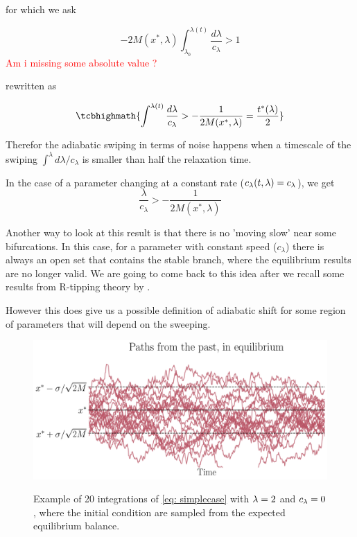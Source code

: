 for which we ask 

\begin{equation}
 -2M(x^*,\lambda)	\int_{\lambda_0}^{\lambda(t)} \frac{d\lambda}{c_\lambda} >1
\end{equation}
\textcolor{red}{Am i missing some absolute value ?}


rewritten as  

\begin{equation}
	\tcbhighmath{
	\int^{\lambda(t)} \frac{d\lambda}{c_\lambda} >-\frac{1}{2M(x^*,\lambda)}=\frac{t^*(\lambda)}{2}
}
	\label{eq:noiseadiab}
\end{equation}

Therefor the adiabatic swiping in terms of noise happens when a timescale of the swiping  $\int^{\lambda} d\lambda / c_\lambda$ is smaller than half the relaxation time. 

In the case of a parameter changing at a constant rate ($c_\lambda(t,\lambda)=c_\lambda$), we get 
\begin{equation}
	\frac{\lambda}{c_\lambda} >-\frac{1}{2M(x^*,\lambda)}
	\label{eq:noiseadiab_cte}
\end{equation}

Another way to look at this result is that there is no 'moving slow' near some bifurcations. In this case, for a parameter with constant speed ($c_\lambda$) there is always an open set that contains the stable branch, where the equilibrium results are no longer valid. We are going to come back to this idea after we recall some results from R-tipping theory by \cite{Ashwin, the other one}.

However this does give us a possible definition of adiabatic shift for some region of parameters that will depend on the sweeping.  



\begin{figure}[htb]
	\centering
	\includegraphics[width=0.9\linewidth]{Images/Metrics/diff_init2}\\
	\caption{ Example of 20 integrations of \cref{eq: simplecase} with $\lambda=2$ and $c_\lambda=0$, where the initial condition are sampled from the expected equilibrium balance.}
	\label{fig:diffinit}
\end{figure}

